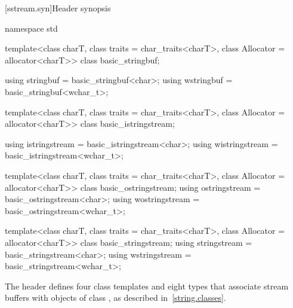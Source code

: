 [sstream.syn]{Header  synopsis}
%

%
%
%
%
%
%
%
%
%
%
%
%
%
%
%
%
\begin{codeblock}
namespace std {
  template<class charT, class traits = char_traits<charT>,
           class Allocator = allocator<charT>>
    class basic_stringbuf;

  using stringbuf  = basic_stringbuf<char>;
  using wstringbuf = basic_stringbuf<wchar_t>;

  template<class charT, class traits = char_traits<charT>,
           class Allocator = allocator<charT>>
    class basic_istringstream;

  using istringstream  = basic_istringstream<char>;
  using wistringstream = basic_istringstream<wchar_t>;

  template<class charT, class traits = char_traits<charT>,
           class Allocator = allocator<charT>>
    class basic_ostringstream;
  using ostringstream  = basic_ostringstream<char>;
  using wostringstream = basic_ostringstream<wchar_t>;

  template<class charT, class traits = char_traits<charT>,
           class Allocator = allocator<charT>>
    class basic_stringstream;
  using stringstream  = basic_stringstream<char>;
  using wstringstream = basic_stringstream<wchar_t>;
}
\end{codeblock}

\pnum
The header
defines four
class templates
and eight types that associate stream buffers with objects of class
,
%
as described in~\ref{string.classes}.

